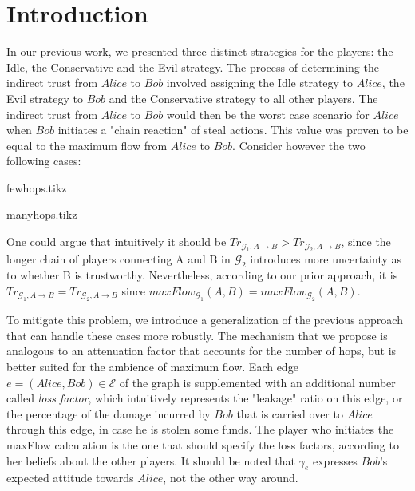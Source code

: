 \section{Introduction}
  In our previous work, we presented three distinct strategies for the players: the Idle, the Conservative and the Evil
  strategy. The process of determining the indirect trust from $Alice$ to $Bob$ involved assigning the Idle strategy to
  $Alice$, the Evil strategy to $Bob$ and the Conservative strategy to all other players. The indirect trust from $Alice$ to
  $Bob$ would then be the worst case scenario for $Alice$ when $Bob$ initiates a "chain reaction" of steal actions. This value
  was proven to be equal to the maximum flow from $Alice$ to $Bob$. Consider however the two following cases:

  {fewhops.tikz}

  {manyhops.tikz}

  One could argue that intuitively it should be $Tr_{\mathcal{G}_1, A \rightarrow B} > Tr_{\mathcal{G}_2, A \rightarrow B}$,
  since the longer chain of players connecting A and B in $\mathcal{G}_2$ introduces more uncertainty as to whether B is
  trustworthy. Nevertheless, according to our prior approach, it is $Tr_{\mathcal{G}_1, A \rightarrow B} = Tr_{\mathcal{G}_2,
  A \rightarrow B}$ since $maxFlow_{\mathcal{G}_1}\left(A, B\right) = maxFlow_{\mathcal{G}_2}\left(A, B\right)$.

  To mitigate this problem, we introduce a generalization of the previous approach that can handle these cases more
  robustly. The mechanism that we propose is analogous to an attenuation factor that accounts for the number of hops, but is
  better suited for the ambience of maximum flow. Each edge $e = \left(Alice, Bob\right) \in \mathcal{E}$ of the graph is
  supplemented with an additional number called \textit{loss factor}, which intuitively represents the "leakage" ratio on this
  edge, or the percentage of the damage incurred by $Bob$ that is carried over to $Alice$ through this edge, in case he is
  stolen some funds. The player who initiates the maxFlow calculation is the one that should specify the loss factors,
  according to her beliefs about the other players. It should be noted that $\gamma_e$ expresses $Bob$'s expected attitude
  towards $Alice$, not the other way around.
